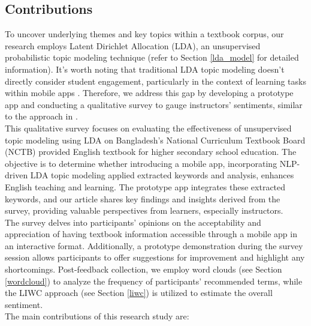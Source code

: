 \documentclass[sn-mathphys,Numbered]{sn-jnl}%
\theoremstyle{thmstyleone}%
\theoremstyle{thmstyletwo}%
\theoremstyle{thmstylethree}%
\begin{document}
\subsection{Contributions} 

To uncover underlying themes and key topics within a textbook corpus, our research employs Latent Dirichlet Allocation (LDA), an unsupervised probabilistic topic modeling technique \cite{jelodar_latent_2019} (refer to Section \ref{lda_model} for detailed information). It's worth noting that traditional LDA topic modeling doesn't directly consider student engagement, particularly in the context of learning tasks within mobile apps \cite{sandberg_mobile_2011}. Therefore, we address this gap by developing a prototype app and conducting a qualitative survey to gauge instructors' sentiments, similar to the approach in \cite{oz2015investigation}.\\

This qualitative survey focuses on evaluating the effectiveness of unsupervised topic modeling using LDA on Bangladesh's National Curriculum Textbook Board (NCTB) provided English textbook for higher secondary school education. The objective is to determine whether introducing a mobile app, incorporating NLP-driven LDA topic modeling applied extracted keywords and analysis, enhances English teaching and learning. The prototype app integrates these extracted keywords, and our article shares key findings and insights derived from the survey, providing valuable perspectives from learners, especially instructors.\\

The survey delves into participants' opinions on the acceptability and appreciation of having textbook information accessible through a mobile app in an interactive format. Additionally, a prototype demonstration during the survey session allows participants to offer suggestions for improvement and highlight any shortcomings. Post-feedback collection, we employ word clouds (see Section \ref{wordcloud}) to analyze the frequency of participants' recommended terms, while the LIWC approach (see Section \ref{liwc}) is utilized to estimate the overall sentiment.\\

The main contributions of this research study are:
\end{document}
